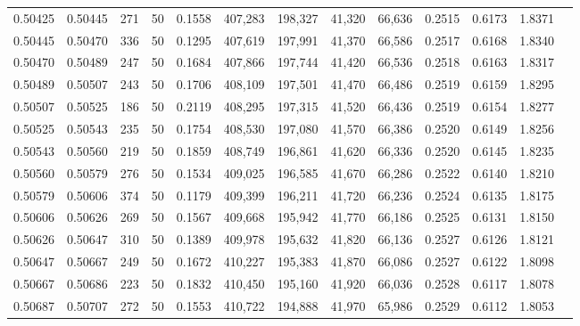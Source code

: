 \begin{tabular}{rrrrrrrrrrrrr}
0.50425 & 0.50445 &   271 &  50 &                                     0.1558 & 407,283 & 198,327 &  41,320 &  66,636 & 0.2515 & 0.6173 & 1.8371 \\
0.50445 & 0.50470 &   336 &  50 &                                     0.1295 & 407,619 & 197,991 &  41,370 &  66,586 & 0.2517 & 0.6168 & 1.8340 \\
0.50470 & 0.50489 &   247 &  50 &                                     0.1684 & 407,866 & 197,744 &  41,420 &  66,536 & 0.2518 & 0.6163 & 1.8317 \\
0.50489 & 0.50507 &   243 &  50 &                                     0.1706 & 408,109 & 197,501 &  41,470 &  66,486 & 0.2519 & 0.6159 & 1.8295 \\
0.50507 & 0.50525 &   186 &  50 &                                     0.2119 & 408,295 & 197,315 &  41,520 &  66,436 & 0.2519 & 0.6154 & 1.8277 \\
0.50525 & 0.50543 &   235 &  50 &                                     0.1754 & 408,530 & 197,080 &  41,570 &  66,386 & 0.2520 & 0.6149 & 1.8256 \\
0.50543 & 0.50560 &   219 &  50 &                                     0.1859 & 408,749 & 196,861 &  41,620 &  66,336 & 0.2520 & 0.6145 & 1.8235 \\
0.50560 & 0.50579 &   276 &  50 &                                     0.1534 & 409,025 & 196,585 &  41,670 &  66,286 & 0.2522 & 0.6140 & 1.8210 \\
0.50579 & 0.50606 &   374 &  50 &                                     0.1179 & 409,399 & 196,211 &  41,720 &  66,236 & 0.2524 & 0.6135 & 1.8175 \\
0.50606 & 0.50626 &   269 &  50 &                                     0.1567 & 409,668 & 195,942 &  41,770 &  66,186 & 0.2525 & 0.6131 & 1.8150 \\
0.50626 & 0.50647 &   310 &  50 &                                     0.1389 & 409,978 & 195,632 &  41,820 &  66,136 & 0.2527 & 0.6126 & 1.8121 \\
0.50647 & 0.50667 &   249 &  50 &                                     0.1672 & 410,227 & 195,383 &  41,870 &  66,086 & 0.2527 & 0.6122 & 1.8098 \\
0.50667 & 0.50686 &   223 &  50 &                                     0.1832 & 410,450 & 195,160 &  41,920 &  66,036 & 0.2528 & 0.6117 & 1.8078 \\
0.50687 & 0.50707 &   272 &  50 &                                     0.1553 & 410,722 & 194,888 &  41,970 &  65,986 & 0.2529 & 0.6112 & 1.8053 \\

\end{tabular}

